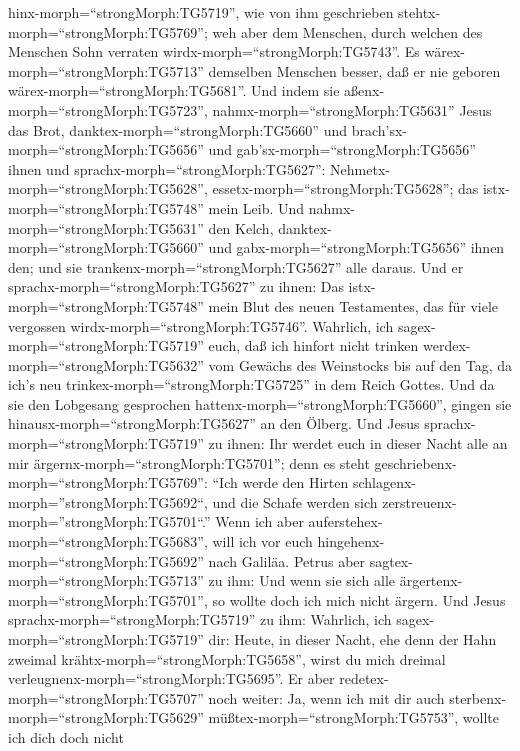 hinx-morph=``strongMorph:TG5719'', wie von ihm geschrieben
stehtx-morph=``strongMorph:TG5769''; weh aber dem Menschen, durch
welchen des Menschen Sohn verraten wirdx-morph=``strongMorph:TG5743''.
Es wärex-morph=``strongMorph:TG5713'' demselben Menschen besser, daß er
nie geboren wärex-morph=``strongMorph:TG5681''.  Und indem
sie aßenx-morph=``strongMorph:TG5723'',
nahmx-morph=``strongMorph:TG5631'' Jesus das Brot,
danktex-morph=``strongMorph:TG5660'' und
brach'sx-morph=``strongMorph:TG5656'' und
gab'sx-morph=``strongMorph:TG5656'' ihnen und
sprachx-morph=``strongMorph:TG5627'':
Nehmetx-morph=``strongMorph:TG5628'',
essetx-morph=``strongMorph:TG5628''; das
istx-morph=``strongMorph:TG5748'' mein Leib.  Und
nahmx-morph=``strongMorph:TG5631'' den Kelch,
danktex-morph=``strongMorph:TG5660'' und
gabx-morph=``strongMorph:TG5656'' ihnen den; und sie
trankenx-morph=``strongMorph:TG5627'' alle daraus.  Und er
sprachx-morph=``strongMorph:TG5627'' zu ihnen: Das
istx-morph=``strongMorph:TG5748'' mein Blut des neuen Testamentes, das
für viele vergossen wirdx-morph=``strongMorph:TG5746''. 
Wahrlich, ich sagex-morph=``strongMorph:TG5719'' euch, daß ich hinfort
nicht trinken werdex-morph=``strongMorph:TG5632'' vom Gewächs des
Weinstocks bis auf den Tag, da ich's neu
trinkex-morph=``strongMorph:TG5725'' in dem Reich Gottes. 
Und da sie den Lobgesang gesprochen
hattenx-morph=``strongMorph:TG5660'', gingen sie
hinausx-morph=``strongMorph:TG5627'' an den Ölberg.  Und
Jesus sprachx-morph=``strongMorph:TG5719'' zu ihnen: Ihr werdet euch in
dieser Nacht alle an mir ärgernx-morph=``strongMorph:TG5701''; denn es
steht geschriebenx-morph=``strongMorph:TG5769'': ``Ich werde den Hirten
schlagenx-morph=''strongMorph:TG5692``, und die Schafe werden sich
zerstreuenx-morph=''strongMorph:TG5701``.''  Wenn ich aber
auferstehex-morph=``strongMorph:TG5683'', will ich vor euch
hingehenx-morph=``strongMorph:TG5692'' nach Galiläa. 
Petrus aber sagtex-morph=``strongMorph:TG5713'' zu ihm: Und wenn sie
sich alle ärgertenx-morph=``strongMorph:TG5701'', so wollte doch ich
mich nicht ärgern.  Und Jesus
sprachx-morph=``strongMorph:TG5719'' zu ihm: Wahrlich, ich
sagex-morph=``strongMorph:TG5719'' dir: Heute, in dieser Nacht, ehe denn
der Hahn zweimal krähtx-morph=``strongMorph:TG5658'', wirst du mich
dreimal verleugnenx-morph=``strongMorph:TG5695''.  Er aber
redetex-morph=``strongMorph:TG5707'' noch weiter: Ja, wenn ich mit dir
auch sterbenx-morph=``strongMorph:TG5629''
müßtex-morph=``strongMorph:TG5753'', wollte ich dich doch nicht
